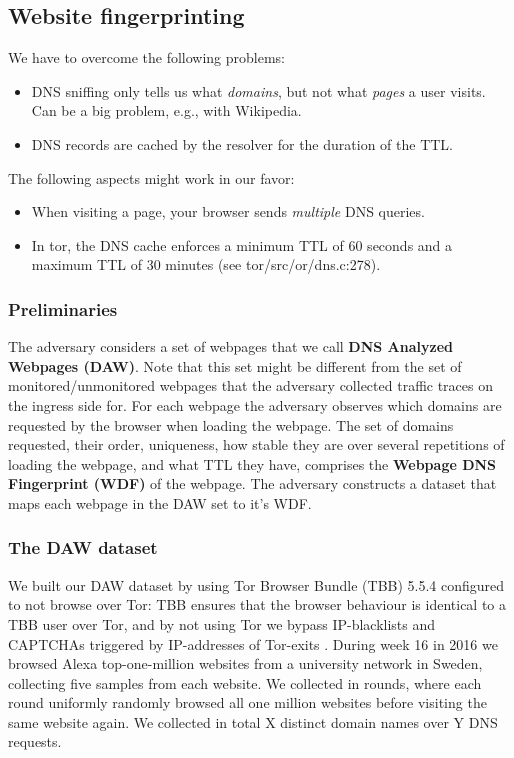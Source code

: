 \subsection{Website fingerprinting}
We have to overcome the following problems:
\begin{itemize}
	\item DNS sniffing only tells us what \emph{domains}, but not what
		\emph{pages} a user visits.  Can be a big problem, e.g., with Wikipedia.
	\item DNS records are cached by the resolver for the duration of the TTL.
\end{itemize}

The following aspects might work in our favor:
\begin{itemize}
	\item When visiting a page, your browser sends \emph{multiple} DNS queries.
	\item In tor, the DNS cache enforces a minimum TTL of 60 seconds and a maximum
	TTL of 30 minutes (see tor/src/or/dns.c:278).
\end{itemize}


\subsubsection{Preliminaries}
The adversary considers a set of webpages that we call \textbf{DNS
Analyzed Webpages (DAW)}. Note that this set might be different from the
set of monitored/unmonitored webpages that the adversary collected
traffic traces on the ingress side for.
For each webpage the adversary observes which domains are requested by
the browser when loading the webpage. The set of domains requested,
their order, uniqueness, how stable they are over several repetitions of
loading the webpage, and what TTL they have, comprises the
\textbf{Webpage DNS Fingerprint (WDF)} of the webpage.
The adversary constructs a dataset that maps each webpage in the DAW set
to it's WDF.

\subsubsection{The DAW dataset}
We built our DAW dataset by using Tor Browser Bundle (TBB) 5.5.4
configured to not browse over Tor: TBB ensures that the browser behaviour is
identical to a TBB user over Tor, and by not using Tor we bypass IP-blacklists
and CAPTCHAs triggered by IP-addresses of Tor-exits \cite{Khattak2016a}.
During week 16 in 2016 we browsed Alexa top-one-million websites from a
university network in Sweden, collecting five samples from each website. We
collected in rounds, where each round uniformly randomly browsed all one
million websites before visiting the same website again. We collected in total
X distinct domain names over Y DNS requests.


